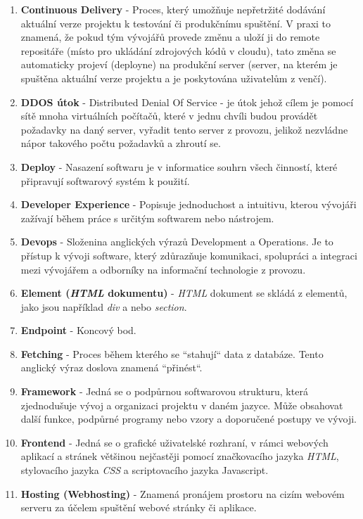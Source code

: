 \documentclass[12pt,a4paper]{report}
\begin{document}
\begin{enumerate}
    \item \textbf{Continuous Delivery} -  Proces, který umožňuje nepřetržité dodávání aktuální verze projektu k testování či produkčnímu spuštění. V praxi to znamená, že pokud tým vývojářů provede změnu a uloží ji do remote repositáře (místo pro ukládání zdrojových kódů v cloudu), tato změna se automaticky projeví (deployne) na produkční server (server, na kterém je spuštěna aktuální verze projektu a je poskytována uživatelům z venčí).
    \item \textbf{DDOS útok} - Distributed Denial Of Service - je útok jehož cílem je pomocí sítě mnoha virtuálních počítačů, které v jednu chvíli budou provádět požadavky na daný server, vyřadit tento server z provozu, jelikož nezvládne nápor takového počtu požadavků a zhroutí se.
    \item \textbf{Deploy} - Nasazení softwaru je v informatice souhrn všech činností, které připravují softwarový systém k použití.
    \item \textbf{Developer Experience} - Popisuje jednoduchost a intuitivu, kterou vývojáři zažívají během práce s určitým softwarem nebo nástrojem.
    \item \textbf{Devops} - Složenina anglických výrazů Development a Operations. Je to přístup k vývoji software, který zdůrazňuje komunikaci, spolupráci a integraci mezi vývojářem a odborníky na informační technologie z provozu. 
    \item \textbf{Element (\emph{HTML} dokumentu)} - \emph{HTML} dokument se skládá z elementů, jako jsou například \emph{div} a nebo \emph{section}.
    \item \textbf{Endpoint} - Koncový bod. 
    \item \textbf{Fetching} - Proces během kterého se ``stahují`` data z databáze. Tento anglický výraz doslova znamená ``přinést``.
    \item \textbf{Framework} - Jedná se o podpůrnou softwarovou strukturu, která zjednodušuje vývoj a organizaci projektu v daném jazyce. Může obsahovat další funkce, podpůrné programy nebo vzory a doporučené postupy ve vývoji.
    \item \textbf{Frontend} - Jedná se o grafické uživatelské rozhraní, v rámci webových aplikací a stránek většinou nejčastěji pomocí značkovacího jazyka \emph{HTML}, stylovacího jazyka \emph{CSS} a scriptovacího jazyka Javascript.
    \item \textbf{Hosting (Webhosting)} - Znamená pronájem prostoru na cizím webovém serveru za účelem spuštění webové stránky či aplikace. 

\end{enumerate}
\end{document}
